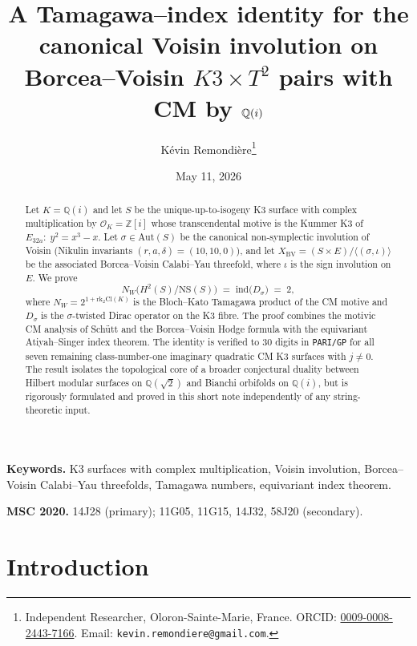 \documentclass[11pt,a4paper]{article}
\title{A Tamagawa--index identity for the canonical Voisin involution
on Borcea--Voisin $K3\times T^{2}$ pairs with CM by $\Q(i)$}
\author{K\'evin Remondi\`ere\thanks{Independent Researcher, Oloron-Sainte-Marie, France. ORCID: \href{https://orcid.org/0009-0008-2443-7166}{0009-0008-2443-7166}.
Email: \texttt{kevin.remondiere@gmail.com}.}}
\date{May 11, 2026}
\theoremstyle{plain}
\theoremstyle{definition}
\newcommand{\Q}{\mathbb{Q}}
\newcommand{\Z}{\mathbb{Z}}
\newcommand{\OK}{\mathcal{O}_K}
\newcommand{\NS}{\mathrm{NS}}
\newcommand{\rk}{\mathrm{rk}}
\newcommand{\ind}{\mathrm{ind}}
\newcommand{\Cl}{\mathrm{Cl}}
\newcommand{\Aut}{\mathrm{Aut}}
\newcommand{\NW}{N_{W}}
\begin{document}
\maketitle

\begin{abstract}
Let $K=\Q(i)$ and let $S$ be the unique-up-to-isogeny K3 surface with
complex multiplication by $\OK=\Z[i]$ whose transcendental motive is the
Kummer K3 of $E_{32a}:\;y^{2}=x^{3}-x$. Let $\sigma\in\Aut(S)$ be the
canonical non-symplectic involution of Voisin (Nikulin invariants
$(r,a,\delta)=(10,10,0)$), and let $X_{\mathrm{BV}}=(S\times E)/\langle
(\sigma,\iota)\rangle$ be the associated Borcea--Voisin Calabi--Yau
threefold, where $\iota$ is the sign involution on $E$. We prove
\[
   \NW\bigl(H^{2}(S)/\NS(S)\bigr)
   \;=\;
   \ind\bigl(D_{\sigma}\bigr)\;=\;2,
\]
where $\NW=2^{1+\rk_{2}\Cl(K)}$ is the Bloch--Kato Tamagawa product of
the CM motive and $D_{\sigma}$ is the $\sigma$-twisted Dirac operator on
the K3 fibre. The proof combines the motivic CM analysis of Sch\"utt and
the Borcea--Voisin Hodge formula with the equivariant Atiyah--Singer index
theorem. The identity is verified to $30$ digits in \texttt{PARI/GP} for all
seven remaining class-number-one imaginary quadratic CM K3 surfaces with
$j\neq 0$. The result isolates the topological core of a broader
conjectural duality between Hilbert modular surfaces on $\Q(\sqrt 2)$ and
Bianchi orbifolds on $\Q(i)$, but is rigorously formulated and proved
in this short note independently of any string-theoretic input.
\end{abstract}

\medskip
\noindent\textbf{Keywords.} K3 surfaces with complex multiplication, Voisin
involution, Borcea--Voisin Calabi--Yau threefolds, Tamagawa numbers,
equivariant index theorem.

\medskip
\noindent\textbf{MSC 2020.} 14J28 (primary); 11G05, 11G15, 14J32, 58J20
(secondary).

\medskip

\section{Introduction}
\label{sec:intro}
\end{document}
